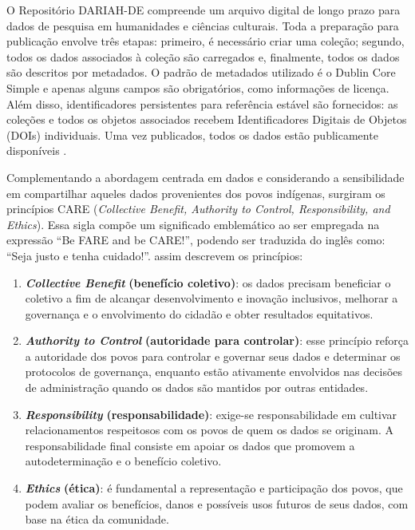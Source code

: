 \documentclass[portuguese]{textolivre}
\begin{document}
O Repositório DARIAH-DE compreende um arquivo digital de longo prazo para dados de pesquisa em humanidades e ciências culturais. Toda a preparação para publicação envolve três etapas: primeiro, é necessário criar uma coleção; segundo, todos os dados associados à coleção são carregados e, finalmente, todos os dados são descritos por metadados. O padrão de metadados utilizado é o Dublin Core Simple e apenas alguns campos são obrigatórios, como informações de licença. Além disso, identificadores persistentes para referência estável são fornecidos: as coleções e todos os objetos associados recebem Identificadores Digitais de Objetos (DOIs) individuais. Uma vez publicados, todos os dados estão publicamente disponíveis \cite{kalman2019}.

Complementando a abordagem centrada em dados e considerando a sensibilidade em compartilhar aqueles dados provenientes dos povos indígenas, surgiram os princípios CARE (\textit{Collective Benefit, Authority to Control, Responsibility, and Ethics}). Essa sigla compõe um significado emblemático ao ser empregada na expressão “Be FARE and be CARE!”, podendo ser traduzida do inglês como: “Seja justo e tenha cuidado!”. \textcite{carroll2020} assim descrevem os princípios:

\begin{enumerate}
    \item \textit{\textbf{Collective Benefit}} \textbf{(benefício coletivo)}: os dados precisam beneficiar o coletivo a fim de alcançar desenvolvimento e inovação inclusivos, melhorar a governança e o envolvimento do cidadão e obter resultados equitativos.
    \item \textit{\textbf{Authority to Control}} \textbf{(autoridade para controlar)}: esse princípio reforça a autoridade dos povos para controlar e governar seus dados e determinar os protocolos de governança, enquanto estão ativamente envolvidos nas decisões de administração quando os dados são mantidos por outras entidades.
    \item \textit{\textbf{Responsibility}} \textbf{(responsabilidade)}: exige-se responsabilidade em cultivar relacionamentos respeitosos com os povos de quem os dados se originam. A responsabilidade final consiste em apoiar os dados que promovem a autodeterminação e o benefício coletivo.
    \item \textit{\textbf{Ethics}} \textbf{(ética)}: é fundamental a representação e participação dos povos, que podem avaliar os benefícios, danos e possíveis usos futuros de seus dados, com base na ética da comunidade.
\end{enumerate}
\end{document}
